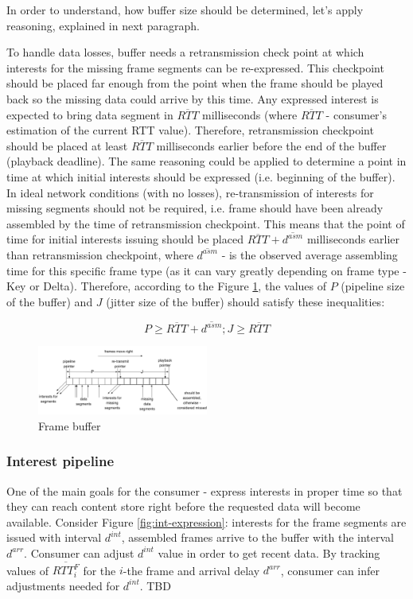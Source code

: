 \documentclass[10pt]{proc}
\begin{document}
In order to understand, how buffer size should be determined, let's apply reasoning, explained in next paragraph.

To handle data losses, buffer needs a retransmission check point at which interests for the missing frame segments can be re-expressed. This checkpoint should be placed far enough from the point when the frame should be played back so the missing data could arrive by this time. Any expressed interest is expected to bring data segment in $\overline{RTT}$ milliseconds (where $\overline{RTT}$ - consumer's estimation of the current RTT value). Therefore, retransmission checkpoint should be placed at least $\overline{RTT}$ milliseconds earlier before the end of the buffer (playback deadline). The same reasoning could be applied to determine a point in time at which initial interests should be expressed (i.e. beginning of the buffer). In ideal network conditions (with no losses), re-transmission of interests for missing segments should not be required, i.e.  frame should have been already assembled by the time of retransmission checkpoint. This means that the point of time for initial interests issuing should be placed $\overline{RTT}+\overline{d^{asm}}$ milliseconds earlier than retransmission checkpoint, where $\overline{d^{asm}}$ - is the observed average assembling time for this specific frame type (as it can vary greatly depending on frame type - Key or Delta). Therefore, according to the Figure \ref{fig:buffer}, the values of $P$ (pipeline size of the buffer) and $J$ (jitter size of the buffer) should satisfy these inequalities:

\begin{equation}
P \geq \overline{RTT} + \overline{d^{asm}}; J \geq \overline{RTT}
\end{equation}


\begin{figure}[Ht!]
\centering
\includegraphics[width=0.5\textwidth]{buffer}
\caption{Frame buffer}
\label{fig:buffer}
\end{figure} 

\subsubsection{Interest pipeline}
One of the main goals for the consumer - express interests in proper time so that they can reach content store right before the requested data will become available. 
Consider Figure \ref{fig:int-expression}: interests for the frame segments are issued with interval $d^{int}$, assembled frames arrive to the buffer with the interval $d^{arr}$. Consumer can adjust $d^{int}$ value in order to get recent data. By tracking values of $\overline{RTT^{F}_i}$ for the $i$-the frame and arrival delay $d^{arr}$, consumer can infer adjustments needed for $d^{int}$. 
TBD
\end{document}
